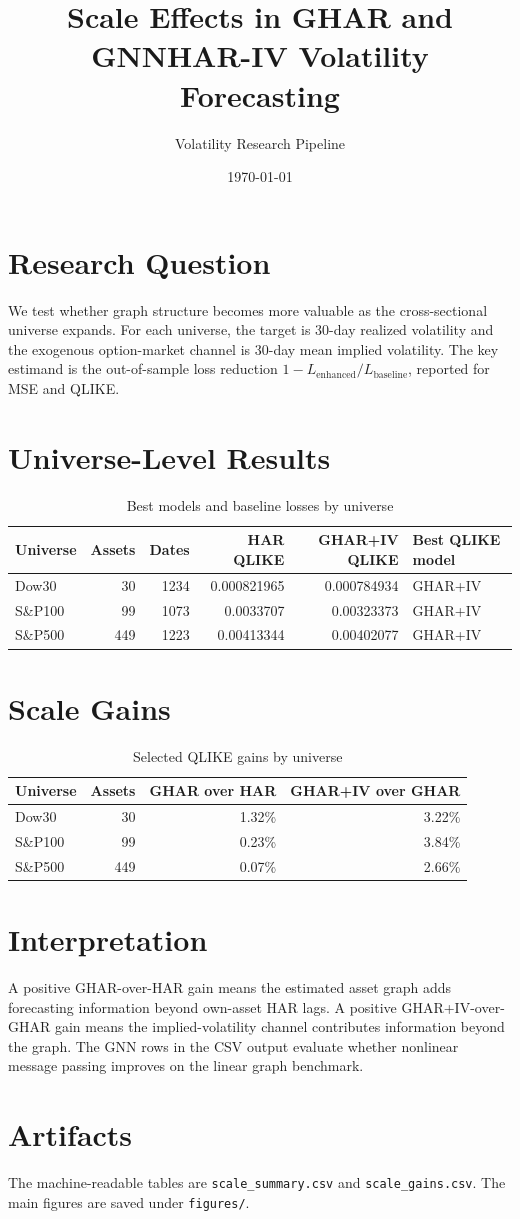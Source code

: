 \documentclass[11pt]{article}
\title{Scale Effects in GHAR and GNNHAR-IV Volatility Forecasting}
\author{Volatility Research Pipeline}
\date{\today}
\begin{document}
\maketitle
\section{Research Question}
We test whether graph structure becomes more valuable as the cross-sectional universe expands. For each universe, the target is 30-day realized volatility and the exogenous option-market channel is 30-day mean implied volatility. The key estimand is the out-of-sample loss reduction \(1 - L_{\mathrm{enhanced}} / L_{\mathrm{baseline}}\), reported for MSE and QLIKE.
\section{Universe-Level Results}
\begin{table}[h]
\centering
\caption{Best models and baseline losses by universe}
\begin{tabular}{lrrrrl}
\toprule
Universe & Assets & Dates & HAR QLIKE & GHAR+IV QLIKE & Best QLIKE model \\
\midrule
Dow30 & 30 & 1234 & 0.000821965 & 0.000784934 & GHAR+IV \\
S\&P100 & 99 & 1073 & 0.0033707 & 0.00323373 & GHAR+IV \\
S\&P500 & 449 & 1223 & 0.00413344 & 0.00402077 & GHAR+IV \\
\bottomrule
\end{tabular}
\end{table}
\section{Scale Gains}
\begin{table}[h]
\centering
\caption{Selected QLIKE gains by universe}
\begin{tabular}{lrrr}
\toprule
Universe & Assets & GHAR over HAR & GHAR+IV over GHAR \\
\midrule
Dow30 & 30 & 1.32\% & 3.22\% \\
S\&P100 & 99 & 0.23\% & 3.84\% \\
S\&P500 & 449 & 0.07\% & 2.66\% \\
\bottomrule
\end{tabular}
\end{table}
\section{Interpretation}
A positive GHAR-over-HAR gain means the estimated asset graph adds forecasting information beyond own-asset HAR lags. A positive GHAR+IV-over-GHAR gain means the implied-volatility channel contributes information beyond the graph. The GNN rows in the CSV output evaluate whether nonlinear message passing improves on the linear graph benchmark.
\section{Artifacts}
The machine-readable tables are \texttt{scale\_summary.csv} and \texttt{scale\_gains.csv}. The main figures are saved under \texttt{figures/}.
\end{document}

